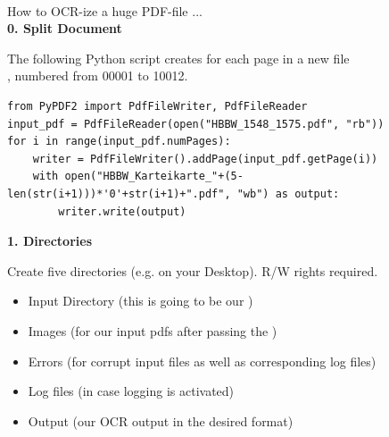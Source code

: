 

\usepackage{wasysym}
\newenvironment{rcases}
  {\left.\begin{aligned}}
  {\end{aligned}\right\rbrace}
\usepackage{nicefrac}
\usepackage{pifont}%
\newcommand{\cmark}{\ding{51}}%
\newcommand{\xmark}{\ding{55}}%



\\
\vspace*{0.3cm}
{\large How to OCR-ize a huge PDF-file ...}\\


\noindent
\textbf{0. Split Document}

\noindent
The following Python script creates for each page in  a new file\\ , numbered from 00001 to 10012.

\begin{lstlisting}
from PyPDF2 import PdfFileWriter, PdfFileReader
input_pdf = PdfFileReader(open("HBBW_1548_1575.pdf", "rb"))
for i in range(input_pdf.numPages):
    writer = PdfFileWriter().addPage(input_pdf.getPage(i))
    with open("HBBW_Karteikarte_"+(5-len(str(i+1)))*'0'+str(i+1)+".pdf", "wb") as output:
        writer.write(output)
\end{lstlisting}

\vspace*{-0.8cm}
\noindent

\bigskip

\noindent
\textbf{1. Directories}

\noindent
Create five directories (e.g. on your Desktop). R/W rights required.

\vspace*{-0.3cm}
\begin{itemize}
\setlength\itemsep{0em}
\item Input Directory (this is going to be our )
\item Images (for our input pdfs after passing the )
\item Errors (for corrupt input files as well as corresponding log files)
\item Log files (in case logging is activated)
\item Output (our OCR output in the desired format)
\end{itemize}

